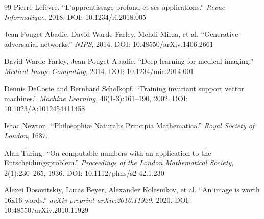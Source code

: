 \documentclass{article}
\begin{document}
\begin{thebibliography}{99}
Pierre Lefèvre.
``L'apprentissage profond et ses applications.''
\textit{Revue Informatique}, 2018.
DOI: 10.1234/ri.2018.005


Jean Pouget-Abadie, David Warde-Farley, Mehdi Mirza, et al.
``Generative adversarial networks.''
\textit{NIPS}, 2014.
DOI: 10.48550/arXiv.1406.2661

David Warde-Farley, Jean Pouget-Abadie.
``Deep learning for medical imaging.''
\textit{Medical Image Computing}, 2014.
DOI: 10.1234/mic.2014.001


Dennis DeCoste and Bernhard Schölkopf.
``Training invariant support vector machines.''
\textit{Machine Learning}, 46(1-3):161--190, 2002.
DOI: 10.1023/A:1012454411458


Isaac Newton.
``Philosophiæ Naturalis Principia Mathematica.''
\textit{Royal Society of London}, 1687.

Alan Turing.
``On computable numbers with an application to the Entscheidungsproblem.''
\textit{Proceedings of the London Mathematical Society}, 2(1):230--265, 1936.
DOI: 10.1112/plms/s2-42.1.230


Alexei Dosovitskiy, Lucas Beyer, Alexander Kolesnikov, et al.
``An image is worth 16x16 words.''
\textit{arXiv preprint arXiv:2010.11929}, 2020.
DOI: 10.48550/arXiv.2010.11929

\end{thebibliography}
\end{document}
